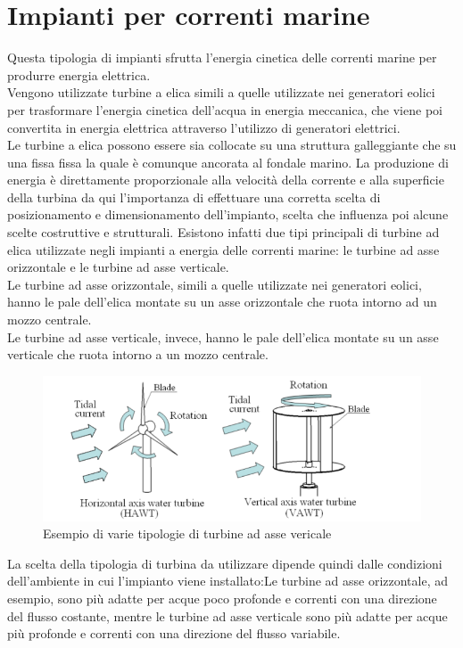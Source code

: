 \section{Impianti per correnti marine}
Questa tipologia di impianti sfrutta l'energia cinetica delle correnti marine per produrre energia elettrica.\\
Vengono utilizzate turbine a elica simili a quelle utilizzate nei generatori eolici per trasformare l'energia cinetica dell'acqua in energia meccanica, che viene poi convertita in energia elettrica attraverso l'utilizzo di generatori elettrici.\\
Le turbine a elica possono essere sia collocate su una struttura galleggiante che su una fissa fissa la quale è comunque ancorata al fondale marino.
La produzione di energia è direttamente proporzionale alla velocità della corrente e alla superficie della turbina da qui l'importanza di effettuare una corretta scelta di posizionamento e dimensionamento dell'impianto, scelta che influenza poi alcune scelte costruttive e strutturali.
Esistono infatti due tipi principali di turbine ad elica utilizzate negli impianti a energia delle correnti marine: le turbine ad asse orizzontale e le turbine ad asse verticale.\\
Le turbine ad asse orizzontale, simili a quelle utilizzate nei generatori eolici, hanno le pale dell'elica montate su un asse orizzontale che ruota intorno ad un mozzo centrale.\\
Le turbine ad asse verticale, invece, hanno le pale dell'elica montate su un asse verticale che ruota intorno a un mozzo centrale.\\
\begin{figure}[H]
    \centering
    \includegraphics[height=0.4\textwidth]{res/cap 3/Ocean current turbine}
    \caption{Esempio di varie tipologie di turbine ad asse vericale\cite{Ocean_current_turbine}}
\end{figure}\noindent
La scelta della tipologia di turbina da utilizzare dipende quindi dalle condizioni dell'ambiente in cui l'impianto viene installato:Le turbine ad asse orizzontale, ad esempio, sono più adatte per acque poco profonde e correnti con una direzione del flusso costante, mentre le turbine ad asse verticale sono più adatte per acque più profonde e correnti con una direzione del flusso variabile.\\
